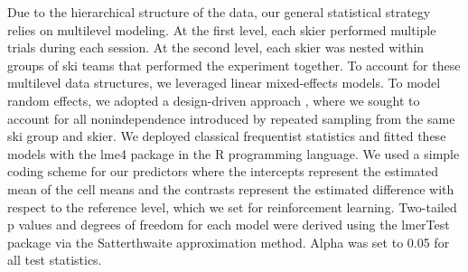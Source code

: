 Due to the hierarchical structure of the data, our general statistical strategy relies on multilevel modeling. At the first level, each skier performed multiple trials during each session. At the second level, each skier was nested within groups of ski teams that performed the experiment together. To account for these multilevel data structures, we leveraged linear mixed-effects models. To model random effects, we adopted a design-driven approach \cite{barr_random_2013, barr_learning_2021}, where we sought to account for all nonindependence introduced by repeated sampling from the same ski group and skier. We deployed classical frequentist statistics and fitted these models with the lme4 package \cite{bates_fitting_2015} in the R \cite{r_core_team_r_2022} programming language. We used a simple coding scheme for our predictors where the intercepts represent the estimated mean of the cell means and the contrasts represent the estimated difference with respect to the reference level, which we set for reinforcement learning. Two-tailed p values and degrees of freedom for each model were derived using the lmerTest package \cite{kuznetsova_lmertest_2017} via the Satterthwaite approximation method. Alpha was set to 0.05 for all test statistics.





























